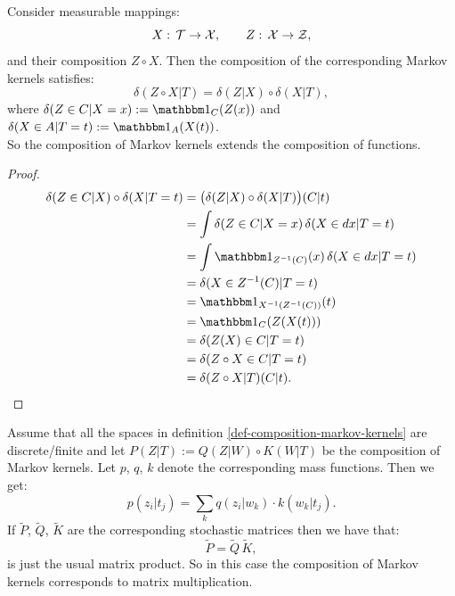 \begin{Rem}
    Consider measurable mappings:
    \[ X:\, \mathcal{T} \to \mathcal{X},\qquad Z:\, \mathcal{X} \to \mathcal{Z}, \]
    and their composition $Z \circ X$. 
    Then the composition of the corresponding Markov kernels satisfies:
    \[  \delta(Z\circ X|T)  = \delta(Z|X) \circ \delta(X|T), \]
    where $\delta(Z \in C|X=x) := \I_C(Z(x))$ and $\delta(X \in A|T=t) := \I_A(X(t))$.\\
    So the composition of Markov kernels extends the composition of functions.
    \begin{proof}
        \begin{align*}
            \delta(Z \in C|X) \circ \delta(X|T=t) 
          & = \big(\delta(Z|X) \circ \delta(X|T)\big)(C|t) \\
        & = \int \delta(Z \in C| X=x) \, \delta(X \in dx|T=t)\\
                                             & = \int \I_{Z^{-1}(C)}(x)\, \delta(X \in dx|T=t)\\
                                             & = \delta(X \in Z^{-1}(C)|T=t)\\
                                             & = \I_{X^{-1}\lp Z^{-1}(C)\rp }(t)\\
                                             & = \I_C(Z(X(t))) \\
                                             & = \delta(Z(X) \in C|T=t)\\
                                             & = \delta(Z \circ X \in C|T=t)\\
                                             & = \delta(Z \circ X|T)(C|t).
        \end{align*}
    \end{proof}
\end{Rem}

\begin{Eg}
    Assume that all the spaces in definition \ref{def-composition-markov-kernels} are discrete/finite and let $P(Z|T):=Q(Z|W) \circ K(W|T)$ be the composition of Markov kernels.
    Let $p$, $q$, $k$ denote the corresponding mass functions. Then we get:
    \[ p(z_i|t_j) = \sum_k q(z_i|w_k) \cdot k(w_k|t_j).  \]
    If $\tilde P$, $\tilde Q$, $\tilde K$ are the corresponding stochastic matrices then we have that:
    \[  \tilde P = \tilde Q \, \tilde K,\]
    is just the usual matrix product. So in this case the composition of Markov kernels corresponds to matrix multiplication.
\end{Eg}

